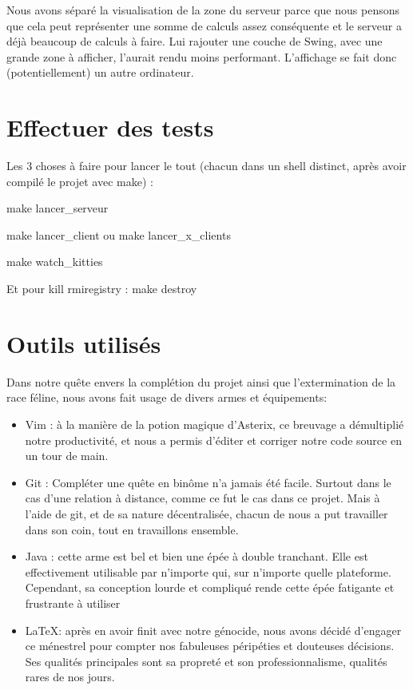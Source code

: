 \documentclass[twoside]{article}
\begin{document}
Nous avons séparé la visualisation de la zone du serveur parce que nous pensons que cela peut représenter une somme de calculs assez conséquente et le serveur a déjà beaucoup de calculs à faire. 
Lui rajouter une couche de Swing, avec une grande zone à afficher, l'aurait rendu moins performant.
L'affichage se fait donc (potentiellement) un autre ordinateur.

\section{Effectuer des tests}
Les 3 choses à faire pour lancer le tout (chacun dans un shell distinct, après avoir compilé le projet avec make) :
\begin{description}
	\item make lancer\_serveur
	\item make lancer\_client ou make lancer\_x\_clients
	\item make watch\_kitties
\end{description}
Et pour kill rmiregistry :
	make destroy

\section{Outils utilisés}
Dans notre quête envers la complétion du projet ainsi que l'extermination de la race féline, nous avons fait usage de divers armes et équipements:
\begin{itemize}
    \item Vim : à la manière de la potion magique d'Asterix, ce breuvage a démultiplié notre productivité, et nous a permis d'éditer et corriger notre code source en un tour de main.
    \item Git : Compléter une quête en binôme n'a jamais été facile. Surtout dans le cas d'une relation à distance, comme ce fut le cas dans ce projet. 
	Mais à l'aide de git, et de sa nature décentralisée, chacun de nous a put travailler dans son coin, tout en travaillons ensemble.
    \item Java : cette arme est bel et bien une épée à double tranchant. Elle est effectivement utilisable par n'importe qui, sur n'importe quelle plateforme. Cependant, sa conception lourde et
        compliqué rende cette épée fatigante et frustrante à utiliser
    \item \LaTeX : après en avoir finit avec notre génocide, nous avons décidé d'engager ce ménestrel pour compter nos fabuleuses péripéties et douteuses décisions.
        Ses qualités principales sont sa propreté et son professionnalisme, qualités rares de nos jours.
\end{itemize}
\end{document}
